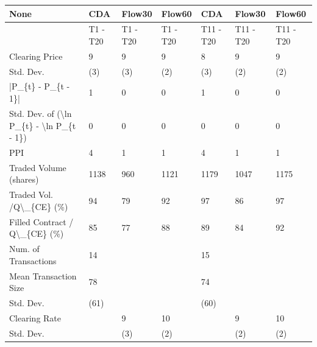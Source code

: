 \begin{tabular}{lllllll}
\hline
 None                                                      & CDA      & Flow30   & Flow60   & CDA       & Flow30    & Flow60    \\
\hline
                                                           & T1 - T20 & T1 - T20 & T1 - T20 & T11 - T20 & T11 - T20 & T11 - T20 \\
 Clearing Price                                            & 9        & 9        & 9        & 8         & 9         & 9         \\
 Std. Dev.                                                 & (3)      & (3)      & (2)      & (3)       & (2)       & (2)       \\
 |P\_\{t\} - P\_\{t - 1\}|                                       & 1        & 0        & 0        & 1         & 0         & 0         \\
 Std. Dev. of (\textbackslash{}ln P\_\{t\} - \textbackslash{}ln P\_\{t - 1\})                  & 0        & 0        & 0        & 0         & 0         & 0         \\
 PPI                                                       & 4        & 1        & 1        & 4         & 1         & 1         \\
 Traded Volume (shares)                                    & 1138     & 960      & 1121     & 1179      & 1047      & 1175      \\
 Traded Vol. /Q\textbackslash{}\_\{CE\} (\%)                                  & 94       & 79       & 92       & 97        & 86        & 97        \\
 Filled Contract / Q\textbackslash{}\_\{CE\} (\%)                             & 85       & 77       & 88       & 89        & 84        & 92        \\
 Num. of Transactions                                      & 14       &          &          & 15        &           &           \\
 Mean Transaction Size                                     & 78       &          &          & 74        &           &           \\
 Std. Dev.                                                 & (61)     &          &          & (60)      &           &           \\
 Clearing Rate                                             &          & 9        & 10       &           & 9         & 10        \\
 Std. Dev.                                                 &          & (3)      & (2)      &           & (2)       & (2)       \\

\end{tabular}
